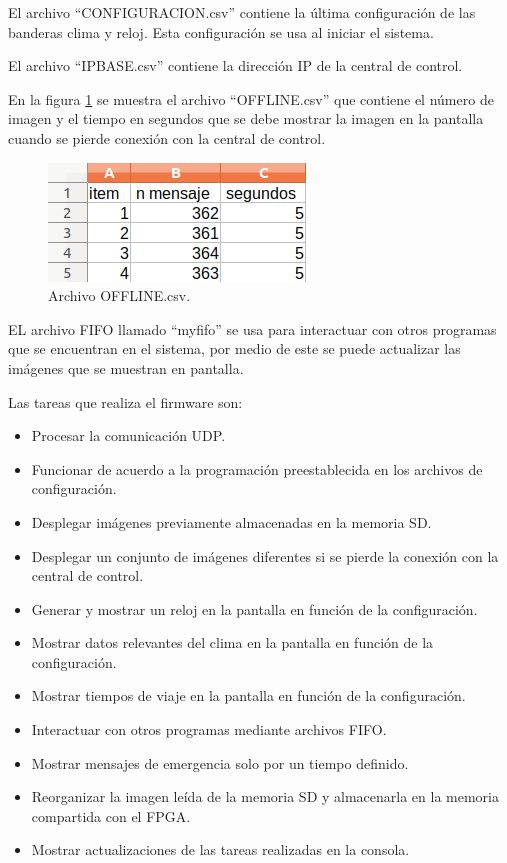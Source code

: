 El archivo ``CONFIGURACION.csv'' contiene la última configuración de las banderas clima y reloj. Esta configuración se usa al iniciar el sistema.

El archivo ``IPBASE.csv'' contiene la dirección IP de la central de control.

En la figura \ref{fig:offlinecsv} se muestra el archivo ``OFFLINE.csv'' que contiene el número de imagen y el tiempo en segundos que se debe mostrar la imagen en la pantalla cuando se pierde conexión con la central de control.

\begin{figure}[htpb]
	\centering
	\includegraphics[scale=0.7]{Figures/offline.png} 
	\caption{Archivo OFFLINE.csv.}
	\label{fig:offlinecsv}
\end{figure}
EL archivo FIFO llamado ``myfifo'' se usa para interactuar con otros programas que se encuentran en el sistema, por medio de este se puede actualizar las imágenes que se muestran en pantalla.


Las tareas que realiza el firmware son:
\begin{itemize}
\item Procesar la comunicación UDP.
\item Funcionar de acuerdo a la programación preestablecida en los archivos de configuración.
\item Desplegar imágenes previamente almacenadas en la memoria SD.  
\item Desplegar un conjunto de imágenes diferentes si se pierde la conexión con la central de control.
\item Generar y mostrar un reloj en la pantalla en función de la configuración.
\item Mostrar datos relevantes del clima en la pantalla en función de la configuración.
\item Mostrar tiempos de viaje en la pantalla en función de la configuración.
\item Interactuar con otros programas mediante archivos FIFO.
\item Mostrar mensajes de emergencia solo por un tiempo definido.
\item Reorganizar la imagen leída de la memoria SD y almacenarla en la memoria compartida con el FPGA.
\item Mostrar actualizaciones de las tareas realizadas en la consola.
\end{itemize}

